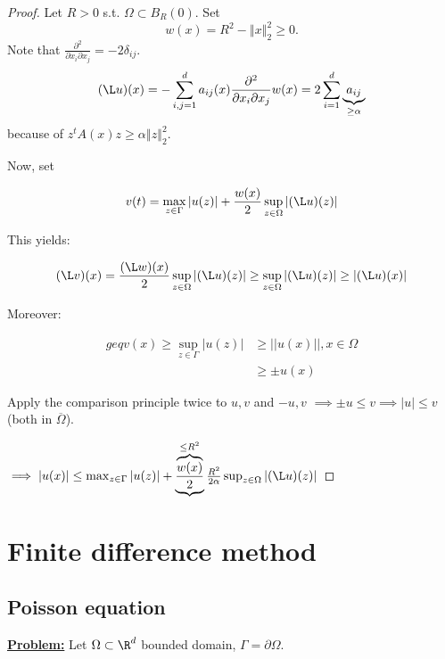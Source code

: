 \begin{proof}
    Let $R>0$ s.t. $\Omega\subset B_R(0)$. Set \[w(x)=R^2-\left\Vert x \right\Vert_2^2\geq 0.\]
    Note that $\frac{\partial^2}{\partial x_i\partial x_j}=-2\delta_{ij}$.
    \begin{align*}
        (\L u)(x)=-\sum_{i,j=1}^da_{ij}(x)\frac{\partial^2}{\partial x_i\partial x_j} w(x)=2\sum_{i=1}^d \underbrace{a_{ij}}_{\geq \alpha}
    \end{align*}
    because of $z^tA(x)z\geq \alpha \left\Vert z \right\Vert_2^2$.
    
    Now, set
    
    \[v(t)=\max_{z\in\Gamma}\left\vert u(z) \right\vert + \frac{w(x)}{2}\sup_{z\in \Omega} \left\vert (\L u)(z) \right\vert\]

    This yields:

    \[(\L v)(x) = \frac{(\L w)(x)}{2}\sup_{z\in \Omega} \left\vert (\L u)(z) \right\vert\geq \sup_{z\in \Omega}\left\vert (\L u)(z) \right\vert\geq |(\L u)(x)|\]

    Moreover:

    \begin{align*}geq
        v(x) \geq \sup_{z\in\Gamma} \left\vert u(z) \right\vert&\geq \left\vert |u(x)| \right\vert, x\in \Omega\\
        &\geq \pm u(x)
    \end{align*}

    Apply the comparison principle twice to $u,v$ and $-u,v$ $\implies \pm u \leq v \implies \left\vert u \right\vert\leq v$ (both in $\overline{\Omega}$).

    $\implies |u(x)|\leq \max_{z\in\Gamma}\left\vert u(z) \right\vert + \underbrace{\frac{\overbrace{w(x)}^{\leq R^2}}{2}}{\frac{R^2}{2\alpha}}\sup_{z\in \Omega} \left\vert (\L u)(z) \right\vert$

\end{proof}

\section{Finite difference method}

\subsection{Poisson equation}

\underline{\textbf{Problem:}} Let $\Omega\subset\R^d$ bounded domain, $\Gamma=\partial\Omega$.

